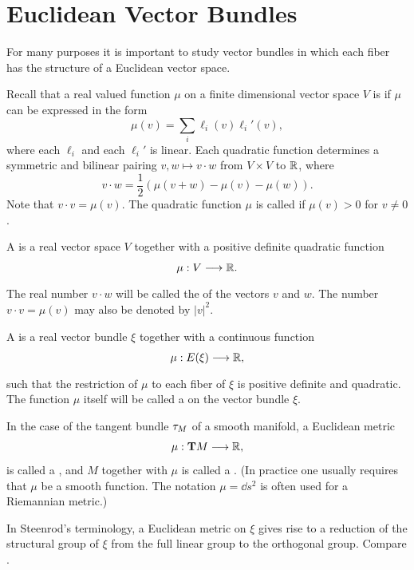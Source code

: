 \documentclass[../main]{subfiles}
\begin{document}
\section{Euclidean Vector Bundles}\label{sec:2.1}
For many purposes it is important to study vector bundles in which each fiber has the structure of a Euclidean vector space.

Recall that a real valued function $\mu$ on a finite dimensional vector
space $V$ is  if $\mu$ can be expressed in the form
\[
\mu(v)=\sum_{i} \ell_{i}(v) \ell_{i}' (v),
\]
where each $\ell_{i}$ and each $\ell_{i}'$ is linear. Each quadratic function determines a symmetric and bilinear pairing $v, w \mapsto v \cdot w$ from $V\times V$ to $\mathbb R$, where
\[
v \cdot w =\frac{1}{2}(\mu(v+w)-\mu(v)-\mu(w)).
\]
Note that $v \cdot v = \mu(v)$. The quadratic function $\mu$ is called  if $\mu(v) > 0$ for $v \neq 0$.


\begin{definition}\label{def:02.05}
A  is a real vector space $V$ together with a positive definite quadratic function	
\[
\mu : V \varrightarrow{} \bR.
\]
The real number $v \cdot w$ will be called the  of the vectors $v$ and $w$. The number $v \cdot v =\mu(v)$ may also be denoted by $|v|^2$.
\end{definition}


\begin{definition}\label{def:02.06}
A  is a real vector bundle $\xi$ together with a continuous function
\[
\mu : \total(\xi) \varrightarrow{} \bR,
\]
such that the restriction of $\mu$ to each fiber of $\xi$ is positive definite and quadratic. The function $\mu$ itself will be called a  on the vector bundle $\xi$.
	
In the case of the tangent bundle $\tau_{M}$ of a smooth manifold, a Euclidean metric
\[
\mu : \mathbf{T}M \longrightarrow \mathbb R,
\]
is called a , and $M$ together with $\mu$ is called a . (In practice one usually requires that $\mu$ be a smooth function. The notation $\mu= \dd s^2$ is often used for a Riemannian metric.)
\end{definition}


\begin{note}
In Steenrod's terminology, a Euclidean metric on $\xi$ gives rise to a reduction of the structural group of $\xi$ from the full linear group to the orthogonal group. Compare \cite[\S 12.9]{steenrod1951}.
\end{note}
\end{document}
